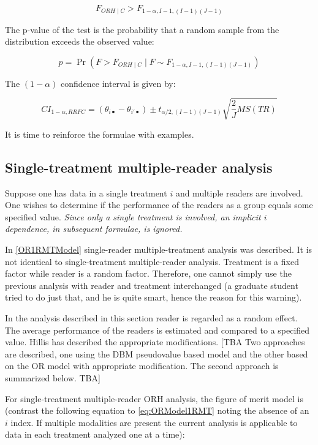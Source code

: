 \documentclass[
]{book}
\begin{document}
\[F_{ORH \mid C}>F_{1-\alpha,I-1,(I-1)(J-1)}\]

The p-value of the test is the probability that a random sample from the distribution exceeds the observed value:

\[p=\Pr(F>F_{ORH \mid C} \mid F \sim F_{1-\alpha,I-1,(I-1)(J-1)})\]

The \((1-\alpha)\) confidence interval is given by:

\begin{equation}
CI_{1-\alpha,RRFC}=(\theta_{i \bullet} - \theta_{i' \bullet}) \pm t_{\alpha/2, (I-1)(J-1)}\sqrt{\frac{2}{J}MS(TR)}
\label{eq:CIalphaRRFC}
\end{equation}

It is time to reinforce the formulae with examples.

\hypertarget{single-treatment-multiple-reader-analysis}{%
\subsection{Single-treatment multiple-reader analysis}\label{single-treatment-multiple-reader-analysis}}

Suppose one has data in a single treatment \(i\) and multiple readers are involved. One wishes to determine if the performance of the readers as a group equals some specified value. \emph{Since only a single treatment is involved, an implicit \(i\) dependence, in subsequent formulae, is ignored.}

In \ref{OR1RMTModel} single-reader multiple-treatment analysis was described. It is not identical to single-treatment multiple-reader analysis. Treatment is a fixed factor while reader is a random factor. Therefore, one cannot simply use the previous analysis with reader and treatment interchanged (a graduate student tried to do just that, and he is quite smart, hence the reason for this warning).

In the analysis described in this section reader is regarded as a random effect. The average performance of the readers is estimated and compared to a specified value. Hillis has described the appropriate modifications. {[}TBA Two approaches are described, one using the DBM pseudovalue based model and the other based on the OR model with appropriate modification. The second approach is summarized below. TBA{]}

For single-treatment multiple-reader ORH analysis, the figure of merit model is (contrast the following equation to \eqref{eq:ORModel1RMT} noting the absence of an \(i\) index. If multiple modalities are present the current analysis is applicable to data in each treatment analyzed one at a time):
\end{document}
